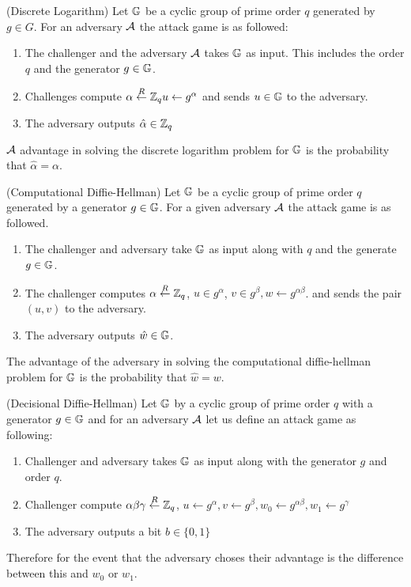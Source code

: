 \begin{attackGame} (Discrete Logarithm)
 Let \(\mathbb{G}\) be a cyclic group of prime order \(q\) generated by \(g \in G\). For an adversary \(\mathcal{A}\) the attack game is as followed: 
 \begin{enumerate}
    \item The challenger and the adversary \(\mathcal{A}\) takes \(\mathbb{G}\) as input. This includes the order \(q\) and the generator \(g \in \mathbb{G}\). 
    \item Challenges compute \(\alpha  \overset{R}{\gets} \mathbb{Z}_q u \gets g^\alpha \) and sends \(u \in \mathbb{G}\) to the adversary. 
    \item The adversary outputs \(\hat{\alpha } \in \mathbb{Z}_q\)         
 \end{enumerate}
 \(\mathcal{A}\) advantage in solving the discrete logarithm problem for \(\mathbb{G}\) is the probability that \(\hat{\alpha } = \alpha \).      
\end{attackGame}

\begin{attackGame} (Computational Diffie-Hellman)
    Let \(\mathbb{G}\) be a cyclic group of prime order \(q\) generated by a generator \(g \in \mathbb{G}\). For a given adversary \(\mathcal{A}\) the attack game is as followed. 
    \begin{enumerate}
        \item  The challenger and adversary take \(\mathbb{G}\) as input along with \(q\) and the generate \(g \in \mathbb{G}\). 
        \item The challenger computes \(\alpha  \overset{R}{\gets} \mathbb{Z}_q\), \(u \in g^\alpha \), \(v \in g^\beta , w \gets g^{\alpha \beta }\). 
        and sends the pair \((u,v)\) to the adversary. 
        \item The adversary outputs \(\hat{w} \in \mathbb{G}\).         
    \end{enumerate}
    The advantage of the adversary in solving the computational diffie-hellman problem for \(\mathbb{G}\) is the probability that \(\hat{w} = w\).  
\end{attackGame}

\begin{attackGame} (Decisional Diffie-Hellman)
    Let \(\mathbb{G}\) by a cyclic group of prime order \(q\) with a generator \(g \in \mathbb{G}\) and for an adversary \(\mathcal{A}\) let us define an attack game as following: 
    \begin{enumerate}
        \item Challenger and adversary takes \(\mathbb{G}\) as input along with the generator \(g\) and order \(q\). 
        \item Challenger compute \(\alpha \beta \gamma \overset{R}{\gets} \mathbb{Z}_q\), \(u \gets g^\alpha , v \gets g^\beta , w_0 \gets g^{\alpha \beta }, w_1 \gets g^\gamma  \)     
        \item The adversary outputs a bit \(b \in \{0,1\}\) 
    \end{enumerate}
    Therefore for the event that the adversary choses their advantage is the difference between this and \(w_0\) or \(w_1\).  
\end{attackGame}

